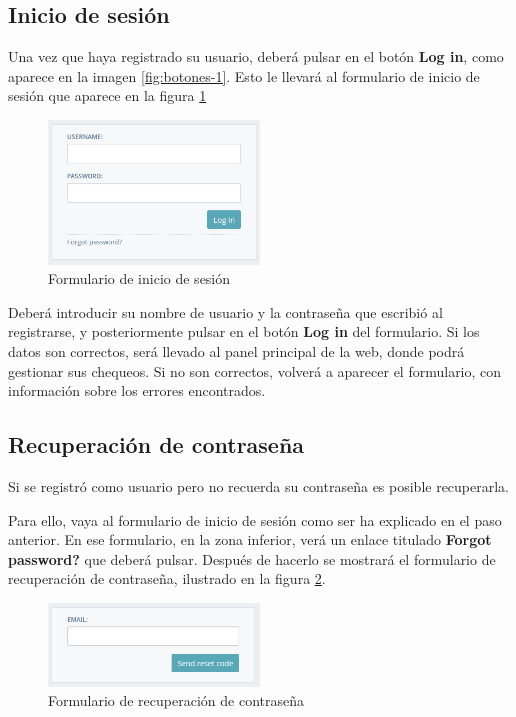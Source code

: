 \subsection{Inicio de sesión}

Una vez que haya registrado su usuario, deberá pulsar en el botón \textbf{Log
  in}, como aparece en la imagen \ref{fig:botones-1}. Esto le llevará al
formulario de inicio de sesión que aparece en la figura \ref{fig:login}

\begin{figure}[hbtp]
  \centering
  \includegraphics[width=0.5\textwidth]{apendice_manual_usuario/general_formulario_login.png}
  \caption{Formulario de inicio de sesión}
  \label{fig:login}
\end{figure}

Deberá introducir su nombre de usuario y la contraseña que escribió al
registrarse, y posteriormente pulsar en el botón \textbf{Log in} del
formulario. Si los datos son correctos, será llevado al panel principal de la
web, donde podrá gestionar sus chequeos. Si no son correctos, volverá a aparecer
el formulario, con información sobre los errores encontrados.

\subsection{Recuperación de contraseña}

Si se registró como usuario pero no recuerda su contraseña es posible
recuperarla.

Para ello, vaya al formulario de inicio de sesión como ser ha explicado en el
paso anterior. En ese formulario, en la zona inferior, verá un enlace titulado
\textbf{Forgot password?} que deberá pulsar. Después de hacerlo se mostrará el
formulario de recuperación de contraseña, ilustrado en la figura
\ref{fig:formulario-reset}.

\begin{figure}[hbtp]
  \centering
  \includegraphics[width=0.5\textwidth]{apendice_manual_usuario/general_formulario_reset.png}
  \caption{Formulario de recuperación de contraseña}
  \label{fig:formulario-reset}
\end{figure}


